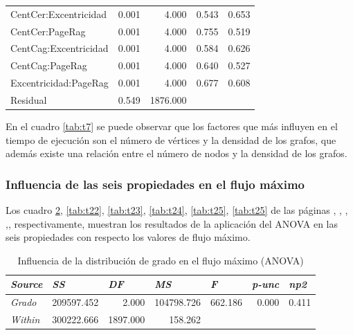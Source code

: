\documentclass{article}
\begin{document}
\begin{table}[htbp]
\begin{tabular}{lrrrr}
    CentCer:Excentricidad & 0.001 & 4.000 & 0.543 & 0.653 \\
    CentCer:PageRag & 0.001 & 4.000 & 0.755 & 0.519 \\
    CentCag:Excentricidad & 0.001 & 4.000 & 0.584 & 0.626 \\
    CentCag:PageRag & 0.001 & 4.000 & 0.640 & 0.527 \\
    Excentricidad:PageRag & 0.001 & 4.000 & 0.677 & 0.608 \\
    Residual & 0.549 & 1876.000 &       &  \\
    \end{tabular}%
  \label{tab:t20}%
\end{table}%

En el cuadro \ref{tab:t7} se puede observar que los factores que más influyen en el tiempo de ejecución son el número de vértices y la densidad de los grafos, que además existe una relación entre el número de nodos y la densidad de los grafos.

\subsubsection{Influencia de las seis propiedades en el flujo máximo}

Los cuadro \ref{tab:t21}, \ref{tab:t22}, \ref{tab:t23}, \ref{tab:t24}, \ref{tab:t25}, \ref{tab:t25} de las páginas \pageref{tab:t21}, \pageref{tab:t22}, \pageref{tab:t23}, \pageref{tab:t24},\pageref{tab:t25}, \pageref{tab:t26} respectivamente, muestran los resultados de la aplicación del ANOVA en las  seis propiedades con respecto los valores de flujo máximo.


\begin{table}[htbp]
  \centering
  \caption{Influencia de la distribución de grado en el flujo máximo (ANOVA)}
    \begin{tabular}{lrrrrrr}
    \toprule
    \textit{\textbf{Source}} & \multicolumn{1}{l}{\textit{\textbf{SS}}} & \multicolumn{1}{l}{\textit{\textbf{DF}}} & \multicolumn{1}{l}{\textit{\textbf{MS}}} & \multicolumn{1}{l}{\textit{\textbf{F}}} & \multicolumn{1}{l}{\textit{\textbf{p-unc}}} & \multicolumn{1}{l}{\textit{\textbf{np2}}} \\
    \midrule
    \textit{Grado} & 209597.452 & 2.000 & 104798.726 & 662.186 & 0.000 & 0.411 \\
    \textit{Within} & 300222.666 & 1897.000 & 158.262 &       &       &  \\
    \bottomrule
    \end{tabular}%
  \label{tab:t21}%
\end{table}%
\end{document}
